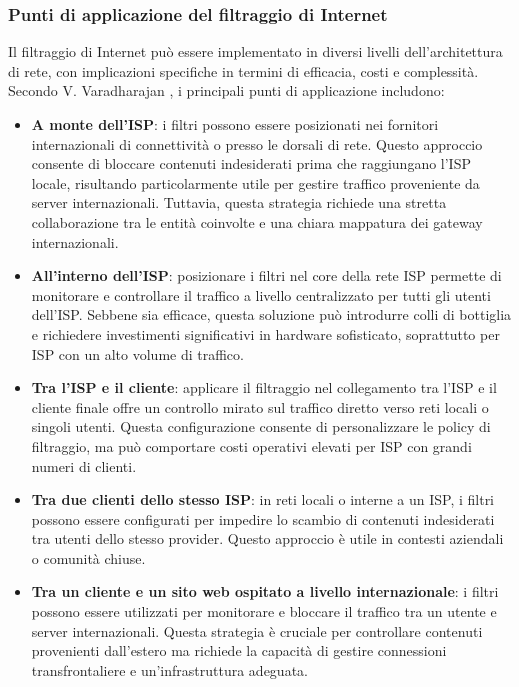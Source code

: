 \subsubsection{Punti di applicazione del filtraggio di Internet}
Il filtraggio di Internet può essere implementato in diversi livelli dell'architettura di rete, con implicazioni specifiche in termini di efficacia, costi e complessità. Secondo V. Varadharajan \cite{Varadharajan2010}, i principali punti di applicazione includono:

\begin{itemize}
  \item \textbf{A monte dell'ISP}: i filtri possono essere posizionati nei fornitori internazionali di connettività o presso le dorsali di rete. Questo approccio consente di bloccare contenuti indesiderati prima che raggiungano l'ISP locale, risultando particolarmente utile per gestire traffico proveniente da server internazionali. Tuttavia, questa strategia richiede una stretta collaborazione tra le entità coinvolte e una chiara mappatura dei gateway internazionali.

  \item \textbf{All'interno dell'ISP}: posizionare i filtri nel core della rete ISP permette di monitorare e controllare il traffico a livello centralizzato per tutti gli utenti dell'ISP. Sebbene sia efficace, questa soluzione può introdurre colli di bottiglia e richiedere investimenti significativi in hardware sofisticato, soprattutto per ISP con un alto volume di traffico.

  \item \textbf{Tra l'ISP e il cliente}: applicare il filtraggio nel collegamento tra l'ISP e il cliente finale offre un controllo mirato sul traffico diretto verso reti locali o singoli utenti. Questa configurazione consente di personalizzare le policy di filtraggio, ma può comportare costi operativi elevati per ISP con grandi numeri di clienti.

  \item \textbf{Tra due clienti dello stesso ISP}: in reti locali o interne a un ISP, i filtri possono essere configurati per impedire lo scambio di contenuti indesiderati tra utenti dello stesso provider. Questo approccio è utile in contesti aziendali o comunità chiuse.

  \item \textbf{Tra un cliente e un sito web ospitato a livello internazionale}: i filtri possono essere utilizzati per monitorare e bloccare il traffico tra un utente e server internazionali. Questa strategia è cruciale per controllare contenuti provenienti dall'estero ma richiede la capacità di gestire connessioni transfrontaliere e un'infrastruttura adeguata.
\end{itemize}

